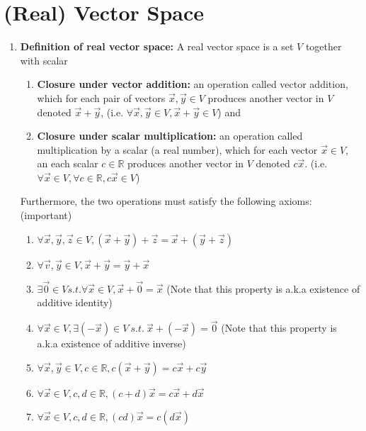 \documentclass[12pt]{book}
\newcommand{\settag}[1]{\renewcommand{\theenumi}{#1}}
\begin{document}
\section{(Real) Vector Space}
\settag{1.1.1}
\begin{enumerate}
    \item{\textbf{Definition of real vector space:}} A real vector space is a set $V$ together with scalar
    \begin{enumerate}
        \item \textbf{Closure under vector addition:} an operation called vector addition, which for each pair of vectors $\vec{x}, \vec{y}\in V$ produces another vector in $V$ denoted $\vec{x} + \vec{y}$, (i.e. $\forall \vec{x}, \vec{y}\in V, \vec{x} + \vec{y} \in V$) and
        \item \textbf{Closure under scalar multiplication:} an operation called multiplication by a scalar (a real number), which for each vector $\vec{x}\in V$, an each scalar $c\in \mathbb{R}$ produces another vector in $V$ denoted $c\vec{x}$. (i.e. $\forall \vec{x}\in V, \forall c \in \mathbb{R}, c \vec{x} \in V$)
    \end{enumerate}
    Furthermore, the two operations must satisfy the following axioms:(important)
    \begin{enumerate}
        \item $\forall \vec{x}, \vec{y}, \vec{z} \in V, (\vec{x} + \vec{y}) + \vec{z} = \vec{x} + (\vec{y} + \vec{z})$
        \item $\forall \vec{v}, \vec{y} \in V, \vec{x} + \vec{y} = \vec{y} + \vec{x}$
        \item $\exists \vec{0} \in V s.t. \forall \vec{x} \in V, \vec{x} + \vec{0} = \vec{x}$ (Note that this property is a.k.a existence of additive identity)
        \item $\forall \vec{x} \in V, \exists (-\vec{x}) \in V~s.t.~\vec{x} + (-\vec{x}) = \vec{0}$ (Note that this property is a.k.a existence of additive inverse)
        \item $\forall \vec{x}, \vec{y} \in V, c \in \mathbb{R}, c(\vec{x} + \vec{y}) = c\vec{x} + c\vec{y}$
        \item $\forall \vec{x} \in V, c,d \in \mathbb{R}, (c + d)\vec{x} = c\vec{x} + d\vec{x}$
        \item $\forall \vec{x} \in V, c,d \in \mathbb{R}, (cd)\vec{x} = c(d\vec{x})$

\end{enumerate}
\end{enumerate}
\end{document}
